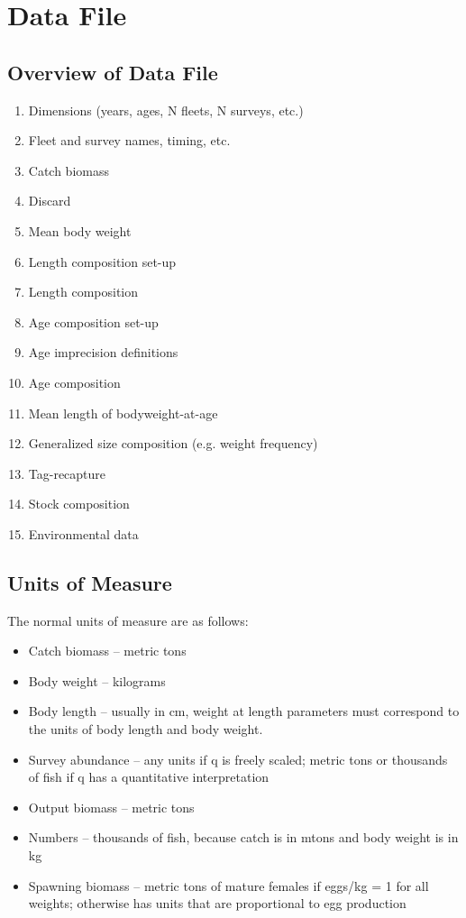 \section{Data File}
\subsection{Overview of Data File}
	\begin{enumerate}
		\item Dimensions (years, ages, N fleets, N surveys, etc.)
		\item Fleet and survey names, timing, etc.
		\item Catch biomass
		\item Discard
		\item Mean body weight
		\item Length composition set-up
		\item Length composition
		\item Age composition set-up
		\item Age imprecision definitions
		\item Age composition
		\item Mean length of bodyweight-at-age
		\item Generalized size composition (e.g. weight frequency)
		\item Tag-recapture
		\item Stock composition
		\item Environmental data
	\end{enumerate}
	
\subsection{Units of Measure}
The normal units of measure are as follows:
\begin{itemize}
	\item Catch biomass -- metric tons	
	\item Body weight -- kilograms	
	\item Body length -- usually in cm, weight at length parameters must correspond to the units of body length and body weight.	
	\item Survey abundance -- any units if q is freely scaled; metric tons or thousands of fish if q has a quantitative interpretation	
	\item Output biomass -- metric tons	
	\item Numbers -- thousands of fish, because catch is in mtons and body weight is in kg	
	\item Spawning biomass -- metric tons of mature females if eggs/kg = 1 for all weights; otherwise has units that are proportional to egg production	
\end{itemize}


